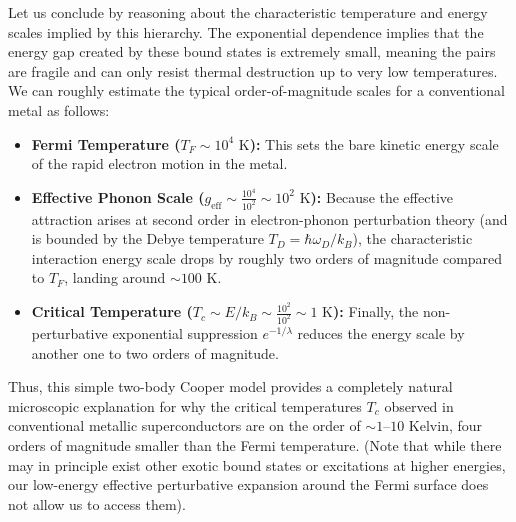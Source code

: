Let us conclude by reasoning about the characteristic temperature and energy scales implied by this hierarchy. The exponential dependence implies that the energy gap created by these bound states is extremely small, meaning the pairs are fragile and can only resist thermal destruction up to very low temperatures. We can roughly estimate the typical order-of-magnitude scales for a conventional metal as follows:
\begin{itemize}
    \item \textbf{Fermi Temperature (\( T_F \sim 10^4\text{ K} \)):} This sets the bare kinetic energy scale of the rapid electron motion in the metal.
    \item \textbf{Effective Phonon Scale (\( g_{\text{eff}} \sim \frac{10^4}{10^2} \sim 10^2\text{ K} \)):} Because the effective attraction arises at second order in electron-phonon perturbation theory (and is bounded by the Debye temperature \( T_D = \hbar\omega_D / k_B \)), the characteristic interaction energy scale drops by roughly two orders of magnitude compared to \( T_F \), landing around \( \sim 100\text{ K} \).
    \item \textbf{Critical Temperature (\( T_c \sim E / k_B \sim \frac{10^2}{10^2} \sim 1\text{ K} \)):} Finally, the non-perturbative exponential suppression \( e^{-1/\lambda} \) reduces the energy scale by another one to two orders of magnitude.
\end{itemize}
Thus, this simple two-body Cooper model provides a completely natural microscopic explanation for why the critical temperatures \( T_c \) observed in conventional metallic superconductors are on the order of \( \sim 1\text{--}10\text{ Kelvin} \), four orders of magnitude smaller than the Fermi temperature. (Note that while there may in principle exist other exotic bound states or excitations at higher energies, our low-energy effective perturbative expansion around the Fermi surface does not allow us to access them).